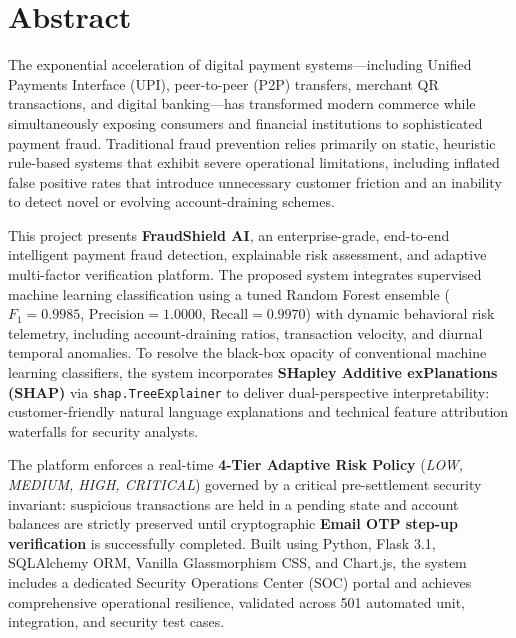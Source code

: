 \chapter{Abstract}
\label{chap:abstract}

The exponential acceleration of digital payment systems—including Unified Payments Interface (UPI), peer-to-peer (P2P) transfers, merchant QR transactions, and digital banking—has transformed modern commerce while simultaneously exposing consumers and financial institutions to sophisticated payment fraud. Traditional fraud prevention relies primarily on static, heuristic rule-based systems that exhibit severe operational limitations, including inflated false positive rates that introduce unnecessary customer friction and an inability to detect novel or evolving account-draining schemes. 

This project presents \textbf{FraudShield AI}, an enterprise-grade, end-to-end intelligent payment fraud detection, explainable risk assessment, and adaptive multi-factor verification platform. The proposed system integrates supervised machine learning classification using a tuned Random Forest ensemble ($F_1 = 0.9985$, $\text{Precision} = 1.0000$, $\text{Recall} = 0.9970$) with dynamic behavioral risk telemetry, including account-draining ratios, transaction velocity, and diurnal temporal anomalies. To resolve the black-box opacity of conventional machine learning classifiers, the system incorporates \textbf{SHapley Additive exPlanations (SHAP)} via \texttt{shap.TreeExplainer} to deliver dual-perspective interpretability: customer-friendly natural language explanations and technical feature attribution waterfalls for security analysts. 

The platform enforces a real-time \textbf{4-Tier Adaptive Risk Policy} (\textit{LOW, MEDIUM, HIGH, CRITICAL}) governed by a critical pre-settlement security invariant: suspicious transactions are held in a pending state and account balances are strictly preserved until cryptographic \textbf{Email OTP step-up verification} is successfully completed. Built using Python, Flask 3.1, SQLAlchemy ORM, Vanilla Glassmorphism CSS, and Chart.js, the system includes a dedicated Security Operations Center (SOC) portal and achieves comprehensive operational resilience, validated across 501 automated unit, integration, and security test cases.
